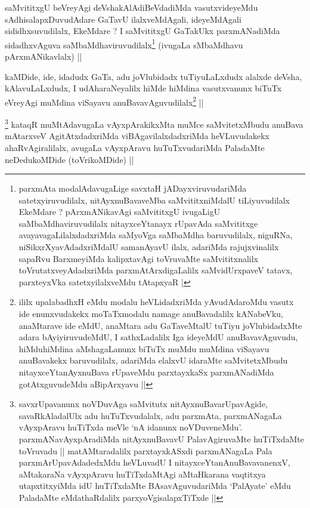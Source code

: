 \begin{artha}
saMvititxgU beVreyAgi deVshakAlAdiBeVdadiMda vasutxvideyeMdu
sAdhisalapxDuvudAdare GaTavU ilalxveMdAgali, ideyeMdAgali
sididhxsuvudilalx, EkeMdare ? I saMvititxgU GaTakUkx parxmANadiMda
sidadhxvAguva saMbaMdhaviruvudilalx\footnote[1]{parxmAta
  modalAdavugaLige savxtaH jADayxviruvudariMda satetxyiruvudilalx,
  nitAyxnuBavaveMba saMvititxniMdalU tiLiyuvudilalx EkeMdare ?
  pArxmANikavAgi saMvititxgU ivugaLigU saMbaMdhaviruvudilalx
  nitayxceYtanayx rUpavAda saMvititxge avayavagaLilalxdadxriMda
  saMyoVga saMbaMdha baruvudilalx, niguRNa, niSikxrXyavAdadxriMdalU
  samanAyavU ilalx, adariMda rajujxvinalilx sapaRvu BarxmeyiMda
  kalipxtavAgi toVruvaMte saMvititxnalilx toVrutatxveyAdadxriMda
  parxmAtArxdigaLalilx saMvidUrxpaveV tatavx, parxteyxVka
  satetxyilalxveMdu tAtapxyaR  |} (ivugaLa sMbaMdhavu
pArxmANikavlalx) || 
\end{artha}


\begin{artha}
kaMDide, ide, idadudx GaTa, adu joVlubidadx tuTiyuLaLxdudx alalxde
deVsha, kAlavuLaLxdudx, I udAharaNeyalilx hiMde hiMdina vasutxvanunx
biTuTx eVreyAgi muMdina viSayavu anuBavavAguvudilalx\footnote[2]{ililx
upalabadhxH eMdu modalu heVLidadxriMda yAvudAdaroMdu vasutx ide
enunxvudakekx moTaTxmodalu namage anuBavadalilx kANabeVku, anaMtarave
ide eMdU, anaMtara adu GaTaveMtalU tuTiyu joVlubidadxMte adara
bAyiyiruvudeMdU, I sathxLadalilx Iga ideyeMdU anuBavavAguvudu,
hiMduhiMdina aMshagaLanunx biTuTx muMdu muMdina viSayavu anuBavakekx
baruvudilalx, adariMda elalxvU idaraMte saMvitetxMbudu
nitayxceYtanAyxnuBava rUpaveMdu parxtayxkaSx parxmANadiMda
gotAtxguvudeMdu aBipArxyavu ||} ||
\end{artha}

\begin{artha}
\footnote[3]{savxrUpavanunx noVDuvAga saMvitutx
  nitAyxnuBavarUpavAgide, savaRkAladalUlx adu huTuTxvudalalx, adu
  parxmAta, parxmANagaLa vAyxpAravu huTiTxda meVle `nA idanunx
  noVDuveneMdu'. parxmANavAyxpAradiMda nitAyxnuBavavU PalavAgiruvaMte
  huTiTxdaMte toVruvadu || matAMtaradalilx parxtayxkASxdi parxmANagaLa
  Pala parxmArUpavAdadedxMdu heVLuvadU I nitayxceYtanAnuBavavanenxV,
  aMtakaraNa vAyxpAravu huTiTxdaMtAgi aMtaHkarana vaqtitxya
  utapxtitxyiMda idU huTiTxdaMte BAsavAguvudariMda `PalAyate' eMdu
  PaladaMte eMdathaRdalilx parxyoVgisalapxTiTxde ||}
kataqR muMtAdavugaLa vAyxpArakikxMta muMce
saMvitetxMbudu anuBava mAtarxveV AgitAtxdadxriMda
viBAgavilalxdadxriMda heVLuvudakekx
ahaRvAgiralilalx, \footnotemark[2]avugaLa vAyxpAravu huTuTxvudariMda
PaladaMte neDedukoMDide (toVrikoMDide) ||
\end{artha}

